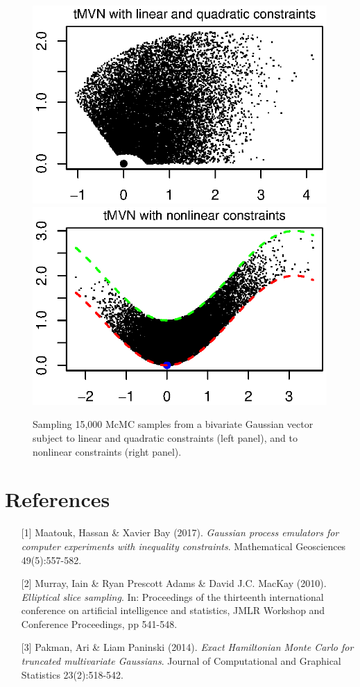 \begin{talk}
\begin{figure}[ht]
\centering
\includegraphics[scale=0.76]{tmvn_linear_quadratic_constr.eps}
\includegraphics[scale=0.76]{tmvn_nonlinear_constr.eps}
\caption{Sampling 15,000 McMC samples from a bivariate Gaussian vector subject to linear and quadratic constraints (left panel), and to nonlinear constraints (right panel).}
\label{fig:tmvn}
\end{figure}





\section*{References}
\begin{enumerate}
	\item[{[1]}] Maatouk, Hassan \& Xavier Bay (2017). {\it Gaussian process emulators for computer experiments with inequality constraints}. Mathematical Geosciences 49(5):557-582.
	\item[{[2]}] Murray, Iain \& Ryan Prescott Adams \&  David J.C. MacKay (2010). {\it Elliptical slice sampling}. In: Proceedings of the thirteenth international conference on artificial intelligence and statistics, JMLR Workshop and Conference Proceedings, pp 541-548.
	\item[{[3]}] Pakman, Ari \& Liam Paninski (2014). {\it Exact Hamiltonian Monte Carlo for truncated multivariate Gaussians}. Journal of Computational and Graphical Statistics 23(2):518-542.
\end{enumerate}


\end{talk}

